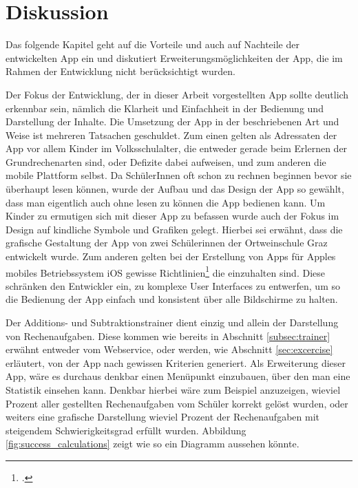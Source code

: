 
\chapter{Diskussion}
\label{chap:disc}

Das folgende Kapitel geht auf die Vorteile und auch auf Nachteile der entwickelten App ein und diskutiert
Erweiterungsmöglichkeiten der App, die im Rahmen der Entwicklung nicht berücksichtigt wurden. 

Der Fokus der Entwicklung, der in dieser Arbeit vorgestellten App sollte deutlich erkennbar sein, nämlich
die Klarheit und Einfachheit in der Bedienung und Darstellung der Inhalte. Die Umsetzung der App in der 
beschriebenen Art und Weise ist mehreren Tatsachen geschuldet. Zum einen gelten als Adressaten der 
App vor allem Kinder im Volksschulalter, die entweder gerade beim Erlernen der Grundrechenarten sind,
oder Defizite dabei aufweisen, und zum anderen die mobile Plattform selbst. Da SchülerInnen oft schon zu 
rechnen beginnen bevor sie überhaupt lesen können, wurde der Aufbau und das Design der App so gewählt,
dass man eigentlich auch ohne lesen zu können die App bedienen kann. Um Kinder zu ermutigen sich mit 
dieser App zu befassen wurde auch der Fokus im Design auf kindliche Symbole und Grafiken gelegt. 
Hierbei sei erwähnt, dass die grafische Gestaltung der App von zwei Schülerinnen der Ortweinschule Graz entwickelt wurde.
Zum anderen gelten bei der Erstellung von Apps für Apples mobiles Betriebssystem iOS gewisse 
Richtlinien\footcite{https://developer.apple.com/library/ios/documentation/userexperience/conceptual/mobilehig/}
die einzuhalten sind. Diese schränken den Entwickler ein, zu komplexe User Interfaces zu entwerfen, 
um so die Bedienung der App einfach und konsistent über alle Bildschirme zu halten.

Der Additions- und Subtraktionstrainer dient einzig und allein der Darstellung von Rechenaufgaben. Diese
kommen wie bereits in Abschnitt \ref{subsec:trainer} erwähnt entweder vom Webservice, oder
werden, wie Abschnitt \ref{sec:excercise} erläutert, von der App nach gewissen Kriterien generiert.
Als Erweiterung dieser App, wäre es durchaus denkbar einen Menüpunkt einzubauen, über den
man eine Statistik einsehen kann. Denkbar hierbei wäre zum Beispiel anzuzeigen, wieviel Prozent 
aller gestellten Rechenaufgaben vom Schüler korrekt gelöst wurden, oder weiters eine grafische
Darstellung wieviel Prozent der Rechenaufgaben mit steigendem Schwierigkeitsgrad erfüllt wurden. 
Abbildung \ref{fig:success_calculations} zeigt wie so ein Diagramm aussehen könnte.

